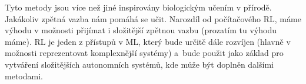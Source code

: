 \documentclass{article}
\begin{document}
Tyto metody jsou více než jiné inspirovány biologickým učením v přírodě. Jakákoliv zpětná vazba nám pomáhá se učit. Narozdíl od počítačového RL, máme výhodu v možnosti přijímat i složitější zpětnou vazbu (prozatím tu výhodu máme). RL je jeden z přístupů v ML, který bude určitě dále rozvíjen (hlavně v možnosti reprezentovat komplexnější systémy) a~bude použit jako základ pro vytváření složitějších autonomních systémů, kde může být doplněn dalšími metodami.

  
  
\end{document}
